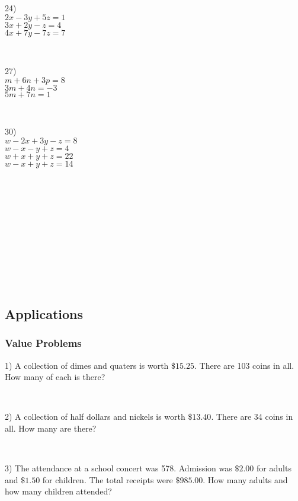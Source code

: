 \begin{multicols}{3}
	24)\\
  $2 x - 3 y + 5 z = 1$\\
  $3 x + 2 y - z = 4$\\
  $4 x + 7 y - 7 z = 7$\par
~\par
  27)\\
  $m + 6 n + 3 p = 8$\\
  $3 m + 4 n = - 3$\\
  $5 m + 7 n = 1$\par
~\par
  30)\\
  $w - 2 x + 3 y - z = 8$\\
	$w - x - y + z = 4$\\
	$w + x + y + z = 22$\\
	$w - x + y + z = 14$\par
~\par
~\par
~\par
~\par
~\par
~\par
	
\end{multicols}

\pagebreak

\subsection{Applications}\par

	\subsubsection{Value Problems}\par

{}

1) A collection of dimes and quaters is worth $\$15.25$. There are
103 coins in all.  How many of each is there?\par
~\par
2) A collection of half dollars and nickels is worth $\$13.40$. There
are 34 coins in  all. How many are there?\par
~\par

3) The attendance at a school concert was 578. Admission was $\$2.00$
for adults  and $\$1.50$ for children. The total
receipts were $\$985.00$. How many adults and  how many
children attended?\par
~\par

